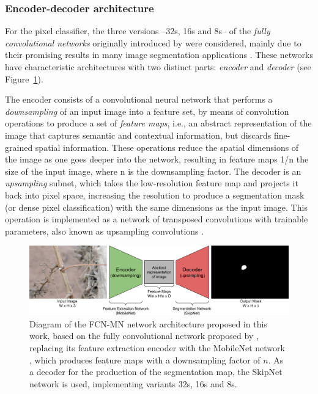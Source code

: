 \documentclass[a4paper,authoryear,review]{elsarticle}
\begin{document}
	\subsubsection {Encoder-decoder architecture}
	\label{sec:fcnmn}
	
	For the pixel classifier, the three versions --32s, 16s and 8s-- of the \emph{fully convolutional networks} originally introduced by \citet{long2015fully} were considered, mainly due to their promising results in many image segmentation applications \citep{litjens2017survey, garcia2018survey, kaymak2019brief}. These networks have characteristic architectures with two distinct parts: \emph{encoder} and \emph{decoder} (see Figure~\ref{fig:Figure1}). 
	
	The encoder consists of a convolutional neural network that performs a \emph{downsampling} of an input image into a feature set, by means of convolution operations to produce a set of \emph{feature maps}, i.e., an abstract representation of the image that captures semantic and contextual information, but discards fine-grained spatial information. These operations reduce the spatial dimensions of the image as one goes deeper into the network, resulting in feature maps 1/n the size of the input image, where n is the downsampling factor. The decoder is an \emph{upsampling} subnet, which takes the low-resolution feature map and projects it back into pixel space, increasing the resolution to produce a segmentation mask (or dense pixel classification) with the same dimensions as the input image. This operation is implemented as a network of transposed convolutions with trainable parameters, also known as upsampling convolutions \citep{shelhamer2017fully}. 
	
	
	\begin{figure}
		\centering
		\includegraphics[width=12cm]{figures/Figure1.png}
		\caption{
			Diagram of the FCN-MN network architecture proposed in this work, based on the fully convolutional network proposed by \citet{shelhamer2017fully}, replacing its feature extraction encoder with the MobileNet network \citet{howard2017mobilenets}, which produces feature maps with a downsampling factor of $n$. As a decoder for the production of the segmentation map, the SkipNet network \citet{siam2018rtseg} is used, implementing variants 32s, 16s and 8s.
		}
		\label{fig:Figure1}
	\end{figure}
	
\end{document}
